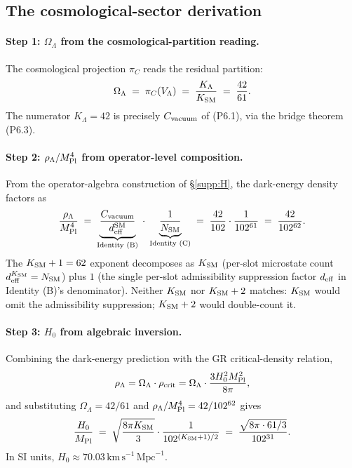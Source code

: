 \documentclass[11pt]{article}
\theoremstyle{plain}
\theoremstyle{definition}
\theoremstyle{remark}
\newcommand{\Mpl}{M_{\rm Pl}}
\begin{document}
\subsection{The cosmological-sector derivation}\label{supp:G2}

\paragraph{Step 1: $\Omega_\Lambda$ from the cosmological-partition reading.}  The cosmological projection $\pi_C$ reads the residual partition:
\[
  \Omega_\Lambda \;=\; \pi_C(V_\Lambda) \;=\; \frac{K_\Lambda}{K_{\rm SM}} \;=\; \frac{42}{61}.
\]
The numerator $K_\Lambda = 42$ is precisely $C_{\rm vacuum}$ of (P6.1), via the bridge theorem (P6.3).

\paragraph{Step 2: $\rho_\Lambda / \Mpl^4$ from operator-level composition.}  From the operator-algebra construction of \S\ref{supp:H}, the dark-energy density factors as
\[
  \frac{\rho_\Lambda}{\Mpl^4} \;=\; \underbrace{\frac{C_{\rm vacuum}}{d_{\rm eff}^{\rm SM}}}_{\text{Identity (B)}} \;\cdot\; \underbrace{\frac{1}{N_{\rm SM}}}_{\text{Identity (C)}} \;=\; \frac{42}{102} \cdot \frac{1}{102^{61}} \;=\; \frac{42}{102^{62}}.
\]
The $K_{\rm SM} + 1 = 62$ exponent decomposes as $K_{\rm SM}$ (per-slot microstate count $d_{\rm eff}^{K_{\rm SM}} = N_{\rm SM}$) plus $1$ (the single per-slot admissibility suppression factor $d_{\rm eff}$ in Identity (B)'s denominator).  Neither $K_{\rm SM}$ nor $K_{\rm SM} + 2$ matches: $K_{\rm SM}$ would omit the admissibility suppression; $K_{\rm SM} + 2$ would double-count it.

\paragraph{Step 3: $H_0$ from algebraic inversion.}  Combining the dark-energy prediction with the GR critical-density relation,
\[
  \rho_\Lambda = \Omega_\Lambda \cdot \rho_{\rm crit} = \Omega_\Lambda \cdot \frac{3 H_0^2 \Mpl^2}{8 \pi},
\]
and substituting $\Omega_\Lambda = 42/61$ and $\rho_\Lambda/\Mpl^4 = 42/102^{62}$ gives
\[
  \frac{H_0}{\Mpl} \;=\; \sqrt{\frac{8 \pi K_{\rm SM}}{3}} \cdot \frac{1}{102^{(K_{\rm SM}+1)/2}} \;=\; \frac{\sqrt{8 \pi \cdot 61 / 3}}{102^{31}}.
\]
In SI units, $H_0 \approx 70.03\,\mathrm{km}\,\mathrm{s}^{-1}\,\mathrm{Mpc}^{-1}$.
\end{document}

